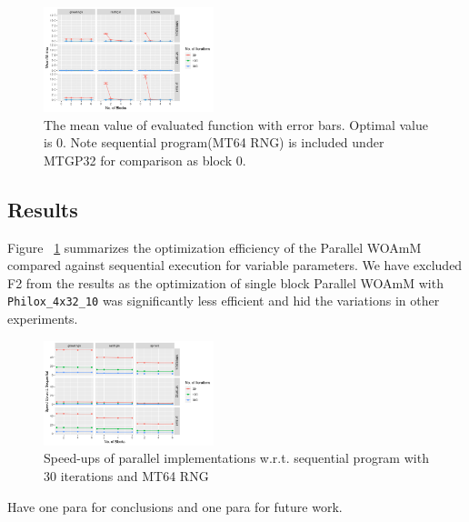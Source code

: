 \documentclass[conference]{IEEEtran}
\begin{document}
\begin{figure}[ht]
    \centering
    \includegraphics[width=0.44\textwidth]{fitness}
    \caption{The mean value of evaluated function with error bars. Optimal value is 0. Note sequential program(MT64 RNG) is included under MTGP32 for comparison as block 0.}
    \label{fig:fitness}
\end{figure}

\subsection{Results}

Figure ~\ref{fig:fitness} summarizes the optimization efficiency of the Parallel WOAmM compared against sequential execution for variable parameters. 
We have excluded F2 from the results as the optimization of single block Parallel WOAmM with \lstinline{Philox_4x32_10} was significantly less efficient and hid the variations in other experiments.

\begin{figure}[ht]
\centering
\includegraphics[width=0.44\textwidth]{speed_up}
\caption{Speed-ups of parallel implementations w.r.t. sequential program with 30 iterations and MT64 RNG}
\end{figure}

Have one para for conclusions and one para for future work.



\end{document}
